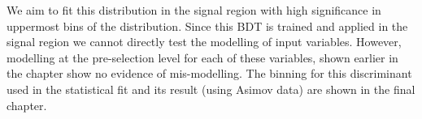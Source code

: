 We aim to fit this distribution in the signal region with high significance in uppermost bins of the distribution. Since this BDT is trained and applied in the signal region we cannot directly test the modelling of input variables. However, modelling at the pre-selection level for each of these variables, shown earlier in the chapter show no evidence of mis-modelling. The binning for this discriminant used in the statistical fit and its result (using Asimov data) are shown in the final chapter. 
